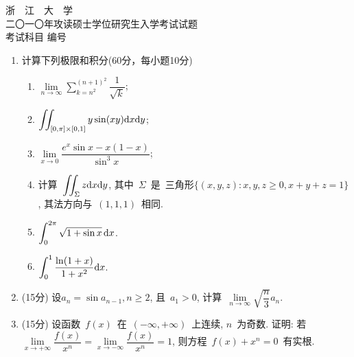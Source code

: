 \documentclass[UTF8,a4paper,11pt]{article}
\begin{document}
\newpage
\setcounter{page}{1}
\begin{center}
	{\Huge 浙~~江~~大~~学}\\
	\setlength{\parskip}{5pt}
	{\Large 二〇一〇年攻读硕士学位研究生入学考试试题}\\
	\setlength{\parskip}{10 pt}
	{\Large 考试科目\underline{} 编号\underline{}}
\end{center}

\begin{enumerate}
	\item 计算下列极限和积分(60分，每小题10分)
	      \begin{enumerate}
		      \item $\lim\limits_{n\to\infty}\sum\limits_{k=n^2}^{(n+1)^2}\dfrac{1}{\sqrt{k}}$;\\
		            \vspace{2em}
		      \item $\displaystyle\iint_{[0,\pi]\times[0,1]} y\sin(xy)\mathrm{d}x\mathrm{d}y$;\\
		            \vspace{2em}
		      \item $\lim\limits_{x\to0}\dfrac{e^x\sin{x}-x(1-x)}{\sin^3{x}}$;\\
		            \vspace{2em}
		      \item 计算~$\displaystyle \iint_{\Sigma} z\mathrm{d}x\mathrm{d}y$, 其中~$\Sigma$~是~三角形$\{(x,y,z): x,y,z\geqslant 0, x+y+z=1\}$, 其法方向与~$(1,1,1)$~相同.
		            \vspace{2em}
		      \item $\displaystyle\int_0^{2\pi} \sqrt{1+\sin{x}}\,\mathrm{d}x$.
		            \vspace{2em}
		      \item $\displaystyle\int_0^1 \dfrac{\ln(1+x)}{1+x^2}\mathrm{d}x$.
		            \vspace{2em}
	      \end{enumerate}
	\item (15分) 设$a_n=\sin{a_{n-1}}, n\geqslant2$, 且~$a_1>0$, 计算~$\lim\limits_{n\to\infty}\sqrt{\dfrac{n}{3}}a_n$.
	      \vspace{2em}
	\item (15分) 设函数~$f(x)$~在~$(-\infty,+\infty)$~上连续, $n$~为奇数. 证明: 若~$\lim\limits_{x\to+\infty}\dfrac{f(x)}{x^n}=\lim\limits_{x\to-\infty}\dfrac{f(x)}{x^n}=1$, 则方程~$f(x)+x^n=0$~有实根.
	      \vspace{2em}

\end{enumerate}
\end{document}
